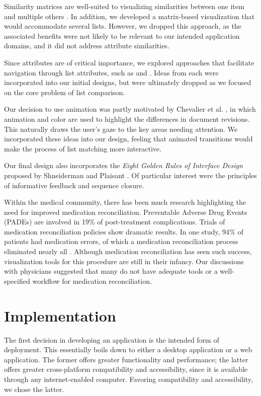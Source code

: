 \documentclass{chi2009}
\begin{document}
Similarity matrices are well-suited to visualizing similarities between one item and multiple others \cite{CornelissenPCODA2007}. In addition, we developed a matrix-based visualization that would accommodate several lists. However, we dropped this approach, as the associated benefits were not likely to be relevant to our intended application domains, and it did not address attribute similarities.

Since attributes are of critical importance, we explored approaches that facilitate navigation through list attributes, such as \cite{Chimera:1992:VBI:142750.142817} and \cite{Masui98lensbar}. Ideas from each were incorporated into our initial designs, but were ultimately dropped as we focused on the core problem of list comparison.

Our decision to use animation was partly motivated by Chevalier et al. \cite{diffmation10}, in which animation and color are used to highlight the differences in document revisions. This naturally draws the user's gaze to the key areas needing attention. We incorporated these ideas into our design, feeling that animated transitions would make the process of list matching more interactive.

Our final design also incorporates the \textit{Eight Golden Rules of Interface Design} proposed by Shneiderman and Plaisant \cite{shneiderman}. Of particular interest were the principles of informative feedback and sequence closure.

Within the medical community, there has been much research \cite{JCAHO-2006} \cite{icutool03} highlighting the need for improved medication reconciliation. Preventable Adverse Drug Events (PADEs) are involved in 19\% of post-treatment complications. Trials of medication reconciliation policies show dramatic results. In one study, 94\% of patients had medication errors, of which a medication reconciliation process eliminated nearly all \cite{icutool03}. Although medication reconciliation has seen such  success, visualization tools for this procedure are still in their infancy. Our discussions with physicians suggested that many do not have adequate tools or a well-specified workflow for medication reconciliation. 

\section{Implementation}
The first decision in developing an application is the intended form of deployment. This essentially boils down to either a desktop application or a web application. The former offers greater functionality and performance; the latter offers greater cross-platform compatibility and accessibility, since it is available through any internet-enabled computer. Favoring compatibility and accessibility, we chose the latter.
\end{document}
